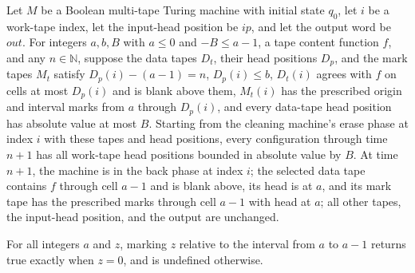\begin{lemma}
\label{Complexity.LogProg.erase_run}
\leanok
{}
Let $M$ be a Boolean multi-tape Turing machine with initial state $q_0$, let $i$ be a
work-tape index, let the input-head position be $ip$, and let the output word be $out$.
For integers $a,b,B$ with $a\le 0$ and $-B\le a-1$, a tape content function $f$, and any
$n\in\mathbb N$, suppose the data tapes $D_t$, their head positions $D_p$, and the mark
tapes $M_t$ satisfy $D_p(i)-(a-1)=n$, $D_p(i)\le b$, $D_t(i)$ agrees with $f$ on cells
at most $D_p(i)$ and is blank above them, $M_t(i)$ has the prescribed origin and
interval marks from $a$ through $D_p(i)$, and every data-tape head position has absolute
value at most $B$. Starting from the cleaning machine's erase phase at index $i$ with
these tapes and head positions, every configuration through time $n+1$ has all work-tape
head positions bounded in absolute value by $B$. At time $n+1$, the machine is in the
back phase at index $i$; the selected data tape contains $f$ through cell $a-1$ and is
blank above, its head is at $a$, and its mark tape has the prescribed marks through cell
$a-1$ with head at $a$; all other tapes, the input-head position, and the output are
unchanged.
\end{lemma}

\begin{lemma}
\label{Complexity.LogProg.markI_empty}
\leanok
{}
For all integers $a$ and $z$, marking $z$ relative to the interval from $a$ to $a-1$
returns true exactly when $z=0$, and is undefined otherwise.
\end{lemma}

